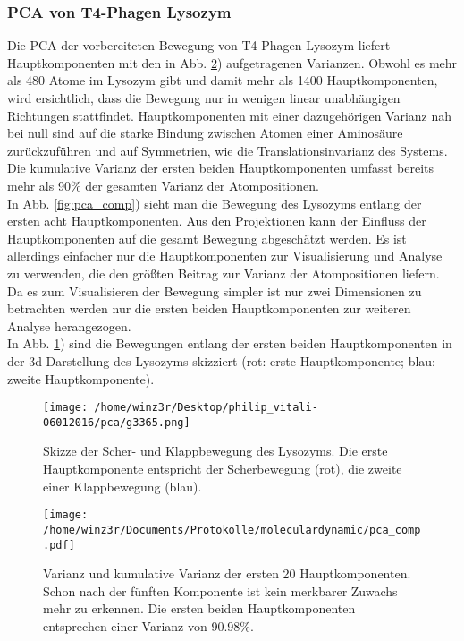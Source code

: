 \subsubsection{PCA von T4-Phagen Lysozym}
Die PCA der vorbereiteten Bewegung von T4-Phagen Lysozym liefert Hauptkomponenten mit den in Abb. \ref{fig:pca_val}) aufgetragenen Varianzen. Obwohl es mehr als 480 Atome im Lysozym gibt und damit mehr als 1400 Hauptkomponenten, wird ersichtlich, dass die Bewegung nur in wenigen linear unabhängigen Richtungen stattfindet. Hauptkomponenten mit einer dazugehörigen Varianz nah bei null sind auf die starke Bindung zwischen Atomen einer Aminosäure zurückzuführen und auf Symmetrien, wie die Translationsinvarianz des Systems.
Die kumulative Varianz der ersten beiden Hauptkomponenten umfasst bereits mehr als 90\% der gesamten Varianz der Atompositionen.
\\ \noindent
In Abb. \ref{fig:pca_comp}) sieht man die Bewegung des Lysozyms entlang der ersten acht Hauptkomponenten.
Aus den Projektionen kann der Einfluss der Hauptkomponenten auf die gesamt Bewegung abgeschätzt werden. Es ist allerdings einfacher nur die Hauptkomponenten zur Visualisierung und Analyse zu verwenden, die den größten Beitrag zur Varianz der Atompositionen liefern.
Da es zum Visualisieren der Bewegung simpler ist nur zwei Dimensionen zu betrachten werden nur die ersten beiden Hauptkomponenten zur weiteren Analyse herangezogen.
\\ \noindent
In Abb. \ref{fig:move}) sind die Bewegungen entlang der ersten beiden Hauptkomponenten in der 3d-Darstellung des Lysozyms skizziert (rot: erste Hauptkomponente; blau: zweite Hauptkomponente).
\begin{figure}
\centering
\texttt{[image: /home/winz3r/Desktop/philip\_vitali-06012016/pca/g3365.png]}\caption{Skizze der Scher- und Klappbewegung des Lysozyms. Die erste Hauptkomponente entspricht der Scherbewegung (rot), die zweite einer Klappbewegung (blau).}\label{fig:move}
\end{figure}

\begin{figure}
\centering
\texttt{[image: /home/winz3r/Documents/Protokolle/moleculardynamic/pca\_comp.pdf]}
\caption{Varianz und kumulative Varianz der ersten 20 Hauptkomponenten. Schon nach der fünften Komponente ist kein merkbarer Zuwachs mehr zu erkennen. Die ersten beiden Hauptkomponenten entsprechen einer Varianz von 90.98\%.}\label{fig:pca_val}
\end{figure}

